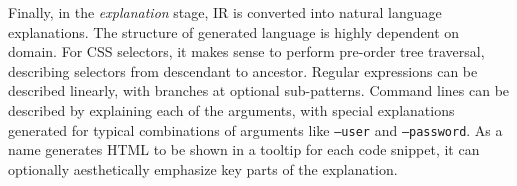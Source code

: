 Finally, in the \emph{explanation} stage, IR is converted into natural language explanations.
The structure of generated language is highly dependent on domain.
For CSS selectors, it makes sense to perform pre-order tree traversal, describing selectors from descendant to ancestor.
Regular expressions can be described linearly, with branches at optional sub-patterns.
Command lines can be described by explaining each of the arguments, with special explanations generated for typical combinations of arguments like \texttt{--user} and \texttt{--password}.
As a \gls{name} generates HTML to be shown in a tooltip for each code snippet, it can optionally aesthetically emphasize key parts of the explanation.
